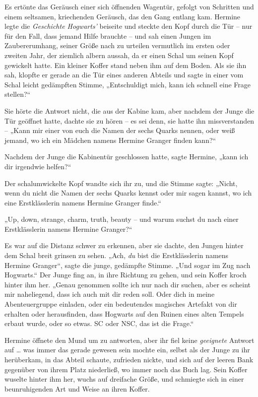 Es ertönte das Geräusch einer sich öffnenden Wagentür, gefolgt von Schritten und einem seltsamen, kriechenden Geräusch, das den Gang entlang kam. Hermine legte die \emph{Geschichte Hogwarts’} beiseite und steckte den Kopf durch die Tür – nur für den Fall, dass jemand Hilfe brauchte – und sah einen Jungen im Zaubererumhang, seiner Größe nach zu urteilen vermutlich im ersten oder zweiten Jahr, der ziemlich albern aussah, da er einen Schal um seinen Kopf gewickelt hatte. Ein kleiner Koffer stand neben ihm auf dem Boden. Als sie ihn sah, klopfte er gerade an die Tür eines anderen Abteils und sagte in einer vom Schal leicht gedämpften Stimme, „Entschuldigt mich, kann ich schnell eine Frage stellen?“ 

Sie hörte die Antwort nicht, die aus der Kabine kam, aber nachdem der Junge die Tür geöffnet hatte, dachte sie zu hören – es sei denn, sie hatte ihn missverstanden – „Kann mir einer von euch die Namen der sechs Quarks nennen, oder weiß jemand, wo ich ein Mädchen namens Hermine Granger finden kann?“ 

Nachdem der Junge die Kabinentür geschlossen hatte, sagte Hermine, „kann ich dir irgendwie helfen?“ 

Der schalumwickelte Kopf wandte sich ihr zu, und die Stimme sagte: „Nicht, wenn du nicht die Namen der sechs Quarks kennst oder mir sagen kannst, wo ich eine Erstklässlerin namens Hermine Granger finde.“ 

„Up, down, strange, charm, truth, beauty – und warum suchst du nach einer Erstklässlerin namens Hermine Granger?“ 

Es war auf die Distanz schwer zu erkennen, aber sie dachte, den Jungen hinter dem Schal breit grinsen zu sehen. „Ach, \emph{du} bist die Erstklässlerin namens Hermine Granger“, sagte die junge, gedämpfte Stimme. „Und sogar im Zug nach Hogwarts.“ Der Junge fing an, in ihre Richtung zu gehen, und sein Koffer kroch hinter ihm her. „Genau genommen sollte ich nur nach dir suchen, aber es scheint mir naheliegend, dass ich auch mit dir reden soll. Oder dich in meine Abenteuergruppe einladen, oder ein bedeutendes magisches Artefakt von dir erhalten oder herausfinden, dass Hogwarts auf den Ruinen eines alten Tempels erbaut wurde, oder so etwas. SC oder NSC, das ist die Frage.“ 

Hermine öffnete den Mund um zu antworten, aber ihr fiel keine \emph{geeignete} Antwort auf … was immer das gerade gewesen sein mochte ein, selbst als der Junge zu ihr herüberkam, in das Abteil schaute, zufrieden nickte, und sich auf der leeren Bank gegenüber von ihrem Platz niederließ, wo immer noch das Buch lag. Sein Koffer wuselte hinter ihm her, wuchs auf dreifache Größe, und schmiegte sich in einer beunruhigenden Art und Weise an ihren Koffer. 

